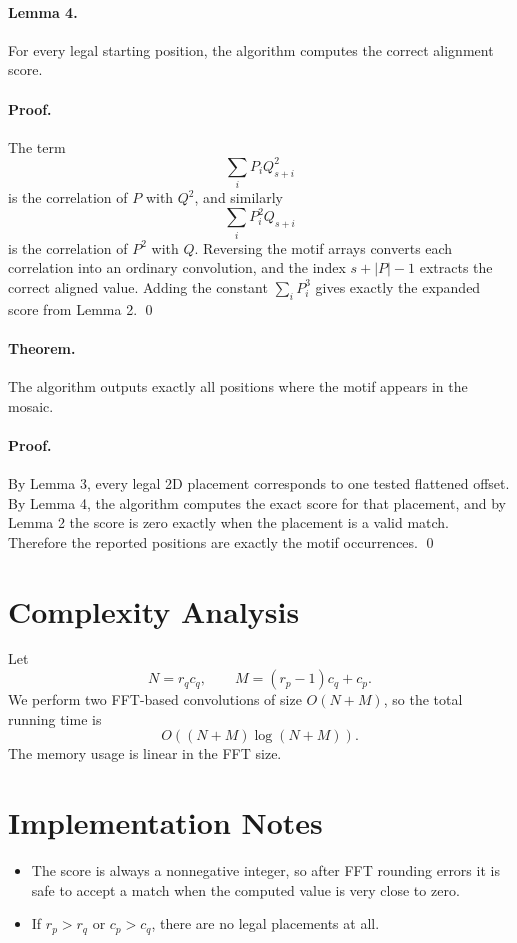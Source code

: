 \documentclass[11pt]{article}
\begin{document}
\paragraph{Lemma 4.}
For every legal starting position, the algorithm computes the correct alignment score.

\paragraph{Proof.}
The term
\[
    \sum_i P_iQ_{s+i}^2
\]
is the correlation of $P$ with $Q^2$, and similarly
\[
    \sum_i P_i^2Q_{s+i}
\]
is the correlation of $P^2$ with $Q$. Reversing the motif arrays converts each correlation into an
ordinary convolution, and the index $s+|P|-1$ extracts the correct aligned value. Adding the constant
$\sum_i P_i^3$ gives exactly the expanded score from Lemma 2. \qed

\paragraph{Theorem.}
The algorithm outputs exactly all positions where the motif appears in the mosaic.

\paragraph{Proof.}
By Lemma 3, every legal 2D placement corresponds to one tested flattened offset. By Lemma 4, the
algorithm computes the exact score for that placement, and by Lemma 2 the score is zero exactly when the
placement is a valid match. Therefore the reported positions are exactly the motif occurrences. \qed

\section*{Complexity Analysis}

Let
\[
    N = r_q c_q, \qquad M = (r_p-1)c_q + c_p.
\]
We perform two FFT-based convolutions of size $O(N+M)$, so the total running time is
\[
    O((N+M)\log(N+M)).
\]
The memory usage is linear in the FFT size.

\section*{Implementation Notes}

\begin{itemize}[leftmargin=*]
    \item The score is always a nonnegative integer, so after FFT rounding errors it is safe to accept a
    match when the computed value is very close to zero.
    \item If $r_p > r_q$ or $c_p > c_q$, there are no legal placements at all.
\end{itemize}
\end{document}

